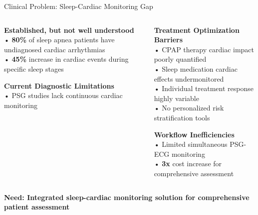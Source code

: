 \documentclass[aspectratio=169,11pt]{beamer}
\newcommand{\highlightbox}[2][tcairemred]{%
  \begin{center}
    \colorbox{#1!20}{\parbox{0.9\textwidth}{\centering\textcolor{#1}{\textbf{#2}}}}
  \end{center}}
\begin{document}
\begin{frame}{Clinical Problem: Sleep-Cardiac Monitoring Gap}

  \begin{columns}[T]
    \begin{column}{0.5\textwidth}
      \colorbox{tcairemred!15}{\parbox{0.95\textwidth}{
        \small
        \textcolor{tcairemred}{\textbf{Established, but not well understood }}\\
        \vspace{0.3em}
        • \textbf{80\%} of sleep apnea patients have undiagnosed cardiac arrhythmias\\
        \vspace{0.2em}
        • \textbf{45\%} increase in cardiac events during specific sleep stages\\
      }}
      
      \vspace{0.5em}
      \colorbox{tcairemorange!15}{\parbox{0.95\textwidth}{
        \small
        \textcolor{tcairemorange}{\textbf{Current Diagnostic Limitations}}\\
        \vspace{0.3em}
        • PSG studies lack continuous cardiac monitoring\\
        \vspace{0.2em}
      }}
    \end{column}
    \begin{column}{0.5\textwidth}
      \colorbox{tcairemgreen!15}{\parbox{0.95\textwidth}{
        \small
        \textcolor{tcairemgreen}{\textbf{Treatment Optimization Barriers}}\\
        \vspace{0.3em}
        • CPAP therapy cardiac impact poorly quantified\\
        \vspace{0.2em}
        • Sleep medication cardiac effects undermonitored\\
        \vspace{0.2em}
        • Individual treatment response highly variable\\
        \vspace{0.2em}
        • No personalized risk stratification tools
      }}
      
      \vspace{0.5em}
      \colorbox{tcairemblue!15}{\parbox{0.95\textwidth}{
        \small
        \textcolor{tcairemblue}{\textbf{Workflow Inefficiencies}}\\
        \vspace{0.3em}
        • Limited simultaneous PSG-ECG monitoring\\
        \vspace{0.2em}
        • \textbf{3x} cost increase for comprehensive assessment
      }}
    \end{column}
  \end{columns}
  
  \begin{center}
    \highlightbox[tcairempurple]{Need: Integrated sleep-cardiac monitoring solution for comprehensive patient assessment}
  \end{center}
\end{frame}
\end{document}
